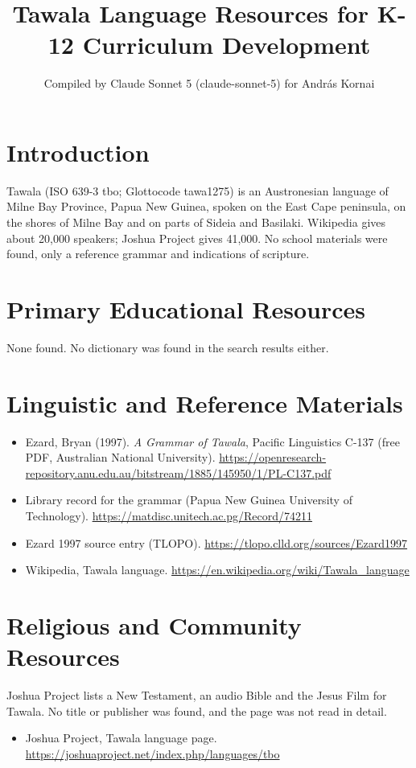 \documentclass[12pt]{article}
\title{Tawala Language Resources for K-12 Curriculum Development}
\author{Compiled by Claude Sonnet 5 (claude-sonnet-5) for Andr\'as Kornai}
\date{}
\begin{document}
\maketitle

\section{Introduction}
Tawala (ISO 639-3 tbo; Glottocode tawa1275) is an Austronesian language of Milne Bay Province, Papua New Guinea, spoken on the East Cape peninsula, on the shores of Milne Bay and on parts of Sideia and Basilaki. Wikipedia gives about 20,000 speakers; Joshua Project gives 41,000. No school materials were found, only a reference grammar and indications of scripture.

\section{Primary Educational Resources}
None found. No dictionary was found in the search results either.

\section{Linguistic and Reference Materials}
\begin{itemize}
\item Ezard, Bryan (1997). \emph{A Grammar of Tawala}, Pacific Linguistics C-137 (free PDF, Australian National University). \url{https://openresearch-repository.anu.edu.au/bitstream/1885/145950/1/PL-C137.pdf}
\item Library record for the grammar (Papua New Guinea University of Technology). \url{https://matdisc.unitech.ac.pg/Record/74211}
\item Ezard 1997 source entry (TLOPO). \url{https://tlopo.clld.org/sources/Ezard1997}
\item Wikipedia, Tawala language. \url{https://en.wikipedia.org/wiki/Tawala_language}
\end{itemize}

\section{Religious and Community Resources}
Joshua Project lists a New Testament, an audio Bible and the Jesus Film for Tawala. No title or publisher was found, and the page was not read in detail.
\begin{itemize}
\item Joshua Project, Tawala language page. \url{https://joshuaproject.net/index.php/languages/tbo}
\end{itemize}
\end{document}
